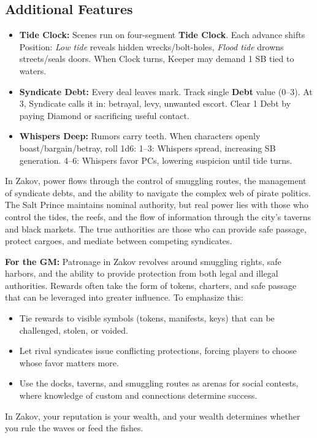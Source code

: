 \subsection*{Additional Features}
\begin{itemize}
\item \textbf{Tide Clock:} Scenes run on four-segment \textbf{Tide Clock}. Each advance shifts Position: \emph{Low tide} reveals hidden wrecks/bolt-holes, \emph{Flood tide} drowns streets/seals doors. When Clock turns, Keeper may demand 1 SB tied to waters.
\item \textbf{Syndicate Debt:} Every deal leaves mark. Track single \textbf{Debt} value (0--3). At 3, Syndicate calls it in: betrayal, levy, unwanted escort. Clear 1 Debt by paying Diamond or sacrificing useful contact.
\item \textbf{Whispers Deep:} Rumors carry teeth. When characters openly boast/bargain/betray, roll 1d6: 1--3: Whispers spread, increasing SB generation. 4--6: Whispers favor PCs, lowering suspicion until tide turns.
\end{itemize}

\begin{tcolorbox}[colback=black!3,colframe=black!40!white,title={Patronage \& Power}]
In Zakov, power flows through the control of smuggling routes, the management of syndicate debts, and the ability to navigate the complex web of pirate politics. The Salt Prince maintains nominal authority, but real power lies with those who control the tides, the reefs, and the flow of information through the city's taverns and black markets. The true authorities are those who can provide safe passage, protect cargoes, and mediate between competing syndicates.

\textbf{For the GM:}  
Patronage in Zakov revolves around smuggling rights, safe harbors, and the ability to provide protection from both legal and illegal authorities. Rewards often take the form of tokens, charters, and safe passage that can be leveraged into greater influence. To emphasize this:
\begin{itemize}
\item Tie rewards to visible symbols (tokens, manifests, keys) that can be challenged, stolen, or voided.
\item Let rival syndicates issue conflicting protections, forcing players to choose whose favor matters more.
\item Use the docks, taverns, and smuggling routes as arenas for social contests, where knowledge of custom and connections determine success.
\end{itemize}
In Zakov, your reputation is your wealth, and your wealth determines whether you rule the waves or feed the fishes.
\end{tcolorbox}

